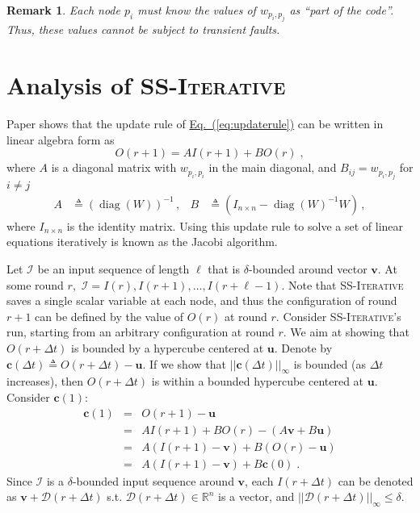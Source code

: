 \documentclass[preprint,12pt]{elsarticle}
\newtheorem{remark}{Remark}
\newcommand{\namedrefeq}[2]{\hyperref[#2]{#1~\mbox{\rm(\ref*{#2})}}}
\newcommand{\equationref}[1]{\namedrefeq{Eq.}{#1}}
\newcommand\norm[1]{\left|\left|#1\right|\right|}
\newcommand\normi[1]{\left|\left|#1\right|\right|_\infty}
\newcommand{\syncAlg}{\textsc{SS-Iterative}\xspace}
\newcommand{\uu}{\mathbf{u}}
\newcommand{\vv}{\mathbf{v}}
\newcommand{\cc}{\mathbf{c}}
\newcommand{\diag}{\mathop{\mathrm{diag}}}
\newcommand{\D}{\mathcal{D}}
\newcommand{\Ir}[1]{I(#1)}
\newcommand{\Or}[1]{O(#1)}
\begin{document}
\begin{remark}\label{rem:partofcode}
  Each node $p_i$ must know the values of $w_{p_i, p_j}$ as ``part of the
  code''. Thus, these values cannot be subject to transient
  faults.
\end{remark}

\section{Analysis of \syncAlg}\label{sec:analysis}
Paper \cite{BibDB:BookBertsekasTsitsiklis} shows that the update rule of
\equationref{eq:updaterule} can be written in linear algebra form
as
\begin{equation}\label{eq:matrixUpdate}
  \Or{r+1} = A\Ir{r+1} + B\Or{r}\;,
\end{equation}
where $A$ is a diagonal matrix with $w_{p_i,p_i}$ in the main
diagonal, and $B_{ij} = w_{p_i, p_j}$ for $i\neq j$
\begin{align}
 A &\triangleq (\diag(W))^{-1}\,, &  B &\triangleq (I_{n \times n} - \diag(W)^{-1}W) \label{AB}\,,
\end{align}
 where $I_{n \times n}$ is the identity matrix. Using this update rule to solve a set of linear equations iteratively is  known as the Jacobi
algorithm.



Let $\mathcal{I}$ be an input sequence of length $\ell$ that is
$\delta$-bounded around vector $\vv$. At some round $r,$  $\mathcal{I} =
\Ir{r}, \Ir{r+1}, \dots, \Ir{r+\ell-1}$. Note
that \syncAlg saves a single scalar variable at each node, and thus the
configuration of round $r+1$ can be defined by the value of
$\Or{r}$ at round $r$. Consider \syncAlg's run, starting from an
arbitrary configuration at round $r$. We aim at showing that
$\Or{r+\Delta t}$ is bounded by a hypercube centered at $\uu$. Denote
by $\cc(\Delta t) \triangleq \Or{r+ \Delta t}-\uu$. If we show
that $\normi{\cc(\Delta t)}$ is bounded (as $\Delta t$ increases),
then $\Or{r+\Delta t}$ is within a bounded hypercube centered at $\uu$.
Consider $\cc(1)$:
\begin{eqnarray} \label{eq:baseInd}
  \cc(1) & = & \Or{r+1}-\uu \nonumber\\
         & = & A\Ir{r+1} + B\Or{r} -(A\vv+B\uu) \nonumber\\
         & = & A(\Ir{r+1}-\vv) + B(\Or{r}-\uu) \nonumber\\
         & = & A(\Ir{r+1}-\vv) + B\cc(0)\;.
\end{eqnarray}
Since $\mathcal{I}$ is a $\delta$-bounded input sequence around
$\vv$, each $\Ir{r+\Delta t}$ can be denoted as
$\vv+\D(r+\Delta t)$ s.t. $\D(r+\Delta t) \in
\mathbb{R}^n$ is a vector, and $\norm{\D(r+\Delta t)}_\infty
\leq \delta$. 
\end{document}
